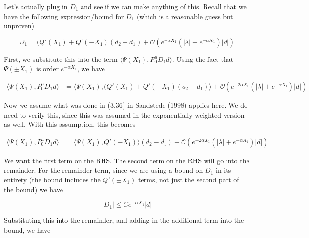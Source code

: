 \documentclass[12pt]{article}
\begin{document}
\begin{enumerate}
Let's actually plug in $D_1$ and see if we can make anything of this. Recall that we have the following expression/bound for $D_1$ (which is a reasonable guess but unproven)

\[
D_1 = ( Q'(X_1) + Q'(-X_1 )(d_2 - d_1) + \mathcal{O} \left( e^{-\alpha X_1} \left( |\lambda| +  e^{-\alpha X_1}  \right) |d| \right)
\]

First, we substitute this into the term $\langle \Psi(X_1), P^u_0 D_1 d \rangle$. Using the fact that $\Psi(\pm X_1)$ is order $e^{-\alpha X_1}$, we have

\begin{align*}
\langle \Psi(X_1), P^u_0 D_1 d \rangle &= \langle \Psi(X_1), (Q'(X_1) + Q'(-X_1 )(d_2 - d_1 ) \rangle + \mathcal{O} \left( e^{-2 \alpha X_1} \left( |\lambda| +  e^{-\alpha X_1}  \right) |d| \right)
\end{align*}

Now we assume what was done in (3.36) in Sandstede (1998) applies here. We do need to verify this, since this was assumed in the exponentially weighted version as well. With this assumption, this becomes

\begin{align*}
\langle \Psi(X_1), P^u_0 D_1 d \rangle &= \langle \Psi(X_1), Q'(-X_1) \rangle (d_2 - d_1 ) + \mathcal{O} \left( e^{-2 \alpha X_1} \left( |\lambda| +  e^{-\alpha X_1}  \right) |d| \right)
\end{align*}

We want the first term on the RHS. The second term on the RHS will go into the remainder. For the remainder term, since we are using a bound on $D_1$ in its entirety (the bound includes the $Q'(\pm X_1)$ terms, not just the second part of the bound) we have

\[
|D_1| \leq C e^{-\alpha X_1}|d|
\]

Substituting this into the remainder, and adding in the additional term into the bound, we have


\end{enumerate}
\end{document}
